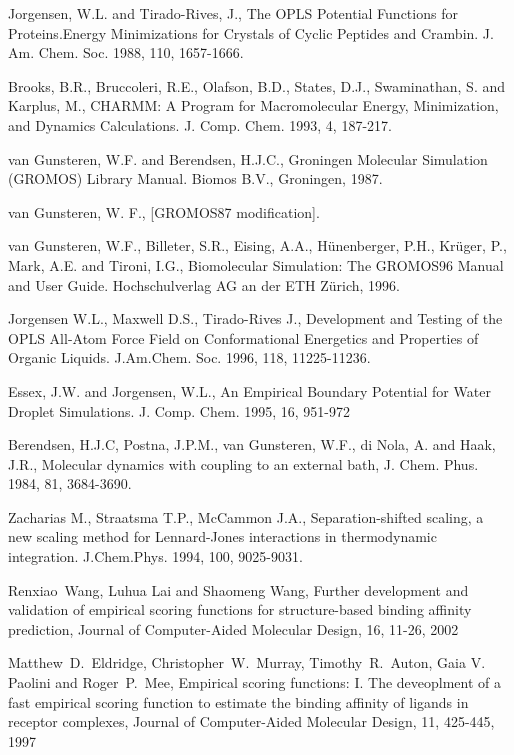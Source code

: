 \documentclass[a4paper,10pt]{article}
\begin{document}
\begin{thebibliography}{2}
 Jorgensen, W.L. and Tirado-Rives, J., The OPLS Potential Functions for Proteins.Energy Minimizations for Crystals of Cyclic Peptides and Crambin. J. Am. Chem. Soc. 1988, 110,
1657-1666.

 Brooks, B.R., Bruccoleri, R.E., Olafson, B.D., States, D.J., Swaminathan, S. and Karplus, M., CHARMM: A Program for Macromolecular Energy, Minimization, and Dynamics Calculations. J. Comp. Chem. 1993, 4,
187-217.

 van Gunsteren, W.F. and Berendsen, H.J.C., Groningen Molecular Simulation (GROMOS) Library Manual. Biomos B.V., Groningen,
1987.

 van Gunsteren, W. F., [GROMOS87
modification].

 van Gunsteren, W.F., Billeter, S.R., Eising, A.A., H{\"u}nenberger, P.H., Kr{\"u}ger, P., Mark, A.E. and Tironi, I.G., Biomolecular Simulation: The GROMOS96 Manual and User Guide. Hochschulverlag AG an der ETH Z{\"u}rich,
1996.

 Jorgensen W.L., Maxwell D.S., Tirado-Rives J., Development and Testing of the OPLS All-Atom Force Field on
Conformational Energetics and Properties of Organic Liquids.
J.Am.Chem. Soc. 1996, 118, 11225-11236.

Essex, J.W. and Jorgensen, W.L., An Empirical Boundary Potential for Water Droplet Simulations. J. Comp. Chem. 1995, 16, 951-972

Berendsen, H.J.C, Postna, J.P.M., van
Gunsteren, W.F., di Nola, A. and Haak, J.R., Molecular dynamics
with coupling to an external bath, J. Chem. Phus. 1984, 81,
3684-3690.

 Zacharias M., Straatsma T.P., McCammon J.A., Separation-shifted scaling, a new scaling method for Lennard-Jones
interactions in thermodynamic integration. J.Chem.Phys. 1994, 100,
9025-9031.

Renxiao~Wang, Luhua Lai and Shaomeng Wang,
Further development and validation of empirical scoring functions for structure-based binding affinity prediction,
Journal of Computer-Aided Molecular Design, 16, 11-26, 2002

Matthew~D.~Eldridge, Christopher~W.~Murray, Timothy~R.~Auton, Gaia V. Paolini and Roger~P.~Mee,
Empirical scoring functions: I. The deveoplment of a fast empirical scoring function to estimate the binding affinity of ligands in receptor complexes, Journal of Computer-Aided Molecular Design, 11, 425-445, 1997


\end{thebibliography}
\end{document}
